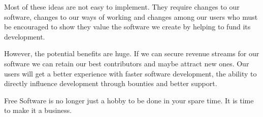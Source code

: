 Most of these ideas are not easy to implement. They require changes to our
software, changes to our ways of working and changes among our users who must be
encouraged to show they value the software we create by helping to fund its
development.

However, the potential benefits are huge. If we can secure revenue streams for
our software we can retain our best contributors and maybe attract new ones. Our
users will get a better experience with faster software development, the ability
to directly influence development through bounties and better support.

Free Software is no longer just a hobby to be done in your spare time. It is
time to make it a business.
